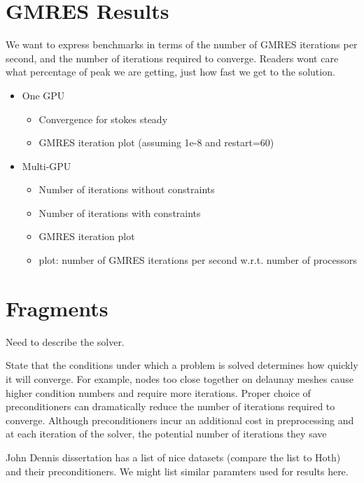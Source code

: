 \section{GMRES Results}

We want to express benchmarks in terms of the number of GMRES iterations per second, and the number of iterations required to converge. Readers wont care what percentage of peak we are getting, just how fast we get to the solution. 

\begin{itemize} 
\item One GPU
\begin{itemize} 
	\item {\color{blue} Convergence for stokes steady}  
	\item {\color{blue} GMRES iteration plot (assuming 1e-8 and restart=60)} 
\end{itemize} 
\item Multi-GPU
	\begin{itemize} 
		\item Number of iterations without constraints
		\item Number of iterations with constraints
		\item GMRES iteration plot
		\item plot: number of GMRES iterations per second w.r.t. number of processors
	\end{itemize} 
\end{itemize} 


\section{Fragments}
Need to describe the solver. 

State that the conditions under which a problem is solved determines how quickly it will converge. For example, nodes too close together on delaunay meshes cause higher condition numbers and require more iterations. Proper choice of preconditioners can dramatically reduce the number of iterations required to converge. Although preconditioners incur an additional cost in preprocessing and at each iteration of the solver, the potential number of iterations they save 


John Dennis dissertation has a list of nice datasets (compare the list to Hoth) and their preconditioners. We might list similar paramters used for results here. 
